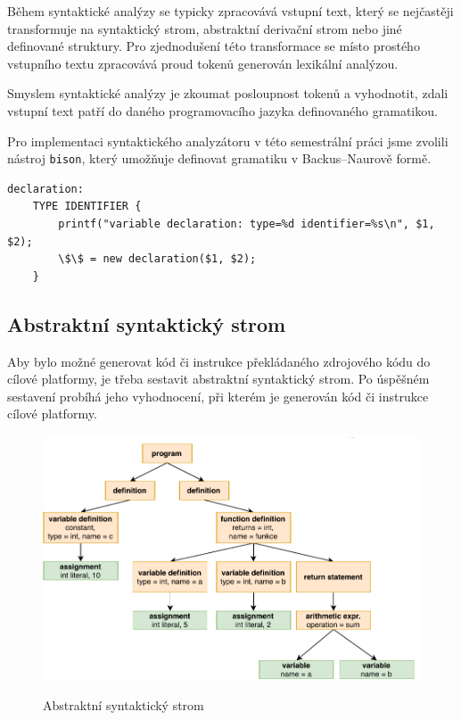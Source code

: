 \documentclass[12pt, a4paper]{article}
\begin{document}
Během syntaktické analýzy se typicky zpracovává vstupní text, který se nejčastěji transformuje na syntaktický strom, abstraktní derivační strom nebo jiné definované struktury. Pro zjednodušení této transformace se místo prostého vstupního textu zpracovává proud tokenů generován lexikální analýzou.

Smyslem syntaktické analýzy je zkoumat posloupnost tokenů a vyhodnotit, zdali vstupní text patří do daného programovacího jazyka definovaného gramatikou.

Pro implementaci syntaktického analyzátoru v této semestrální práci jsme zvolili nástroj \texttt{bison}, který umožňuje definovat gramatiku v Backus–Naurově formě.

\begin{lstlisting}[caption={Ukázka pravidla v \texttt{bison} syntaxi pro deklaraci proměnné}, captionpos=b, style=flex]
declaration:
    TYPE IDENTIFIER {
        printf("variable declaration: type=%d identifier=%s\n", $1, $2);
        \$\$ = new declaration($1, $2);
    }
\end{lstlisting}


\subsection{Abstraktní syntaktický strom}

Aby bylo možné generovat kód či instrukce překládaného zdrojového kódu do cílové platformy, je třeba sestavit abstraktní syntaktický strom. Po úspěšném sestavení probíhá jeho vyhodnocení, při kterém je generován kód či instrukce cílové platformy.

\begin{figure}[!ht]
    \centering
    {\includegraphics[width=\textwidth]{pdf/syntanalysis.pdf}}
    \caption{Abstraktní syntaktický strom}
    \label{fig:screen-transition-diagram}
\end{figure}
\end{document}
